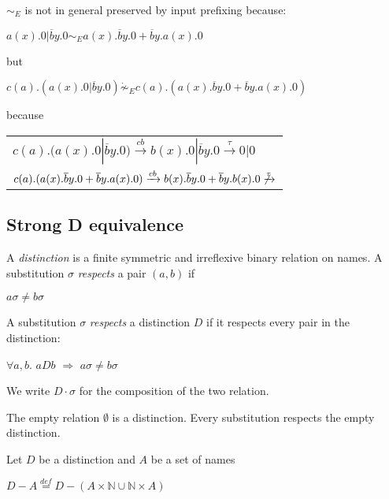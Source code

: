 \begin{example}
  $\sim_{E}$ is not in general preserved by input prefixing because:
    \begin{center}
      $a(x).0 | \overline{b}y.0 \sim_{E} a(x).\overline{b}y.0 + \overline{b}y.a(x).0$
    \end{center}
    but 
    \begin{center}
      $c(a).(a(x).0 | \overline{b}y.0) \dot{\not\sim}_{E} c(a).(a(x).\overline{b}y.0 + \overline{b}y.a(x).0)$
    \end{center}
    because
    \begin{center}
      \begin{tabular}{l}
	  $c(a).(a(x).0 | \overline{b}y.0) \xrightarrow{cb} b(x).0 | \overline{b}y.0 \xrightarrow{\tau} 0|0$
	\\
	  $c(a).(a(x).\overline{b}y.0 + \overline{b}y.a(x).0) \xrightarrow{cb} b(x).\overline{b}y.0 + \overline{b}y.b(x).0 \not\xrightarrow{\tau}$
      \end{tabular}
    \end{center}
\end{example}


\subsection{Strong D equivalence}

\begin{definition}\label{distinction}
  A \emph{distinction} is a finite symmetric and irreflexive binary relation on names. A substitution $\sigma$ \emph{respects} a pair $(a,b)$ if 
  \begin{center}
     $a\sigma\neq b\sigma$
  \end{center}
  A substitution $\sigma$ \emph{respects} a distinction $D$ if it respects every pair in the distinction:
  \begin{center}
     $\forall a,b.$ $aDb$ $\Rightarrow$ $a\sigma\neq b\sigma$
  \end{center}
  We write $D \cdot \sigma$ for the composition of the two relation.
\end{definition}

\begin{example}
  The empty relation $\emptyset$ is a distinction. Every substitution respects the empty distinction.
\end{example}

\begin{definition}
  Let $D$ be a distinction and $A$ be a set of names
  \begin{center}
    $D-A \stackrel{def}{=} D - (A\times \mathbb{N} \cup \mathbb{N} \times A)$
  \end{center}
\end{definition}

